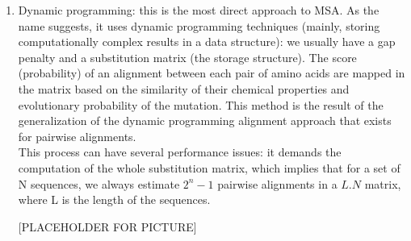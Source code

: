 \documentclass[11pt,twoside,a4paper]{report}
\begin{document}
\begin{enumerate}
\item Dynamic programming: this is the most direct approach to MSA. As the name suggests, it uses dynamic programming techniques (mainly, storing computationally complex results in a data structure): we usually have a gap penalty and a substitution matrix (the storage structure). The score (probability) of an alignment between each pair of amino acids are mapped in the matrix based on the similarity of their chemical properties and evolutionary probability of the mutation. This method is the result of the generalization of the dynamic programming alignment approach that exists for pairwise alignments.\\
This process can have several performance issues: it demands the computation of the whole substitution matrix, which implies that for a set of N sequences, we always estimate $2^{n}-1$ pairwise alignments in a $L.N$ matrix, where L is the length of the sequences. 

[PLACEHOLDER FOR PICTURE]


\end{enumerate}
\end{document}
